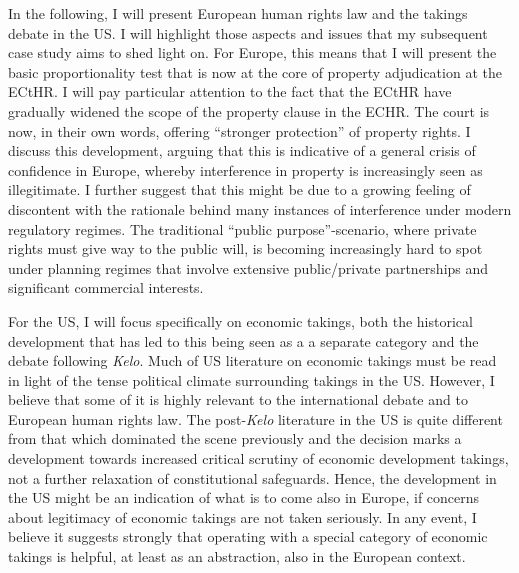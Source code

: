 In the following, I will present European human rights law and the takings debate in the US. I will highlight those aspects and issues that my subsequent case study aims to shed light on. For Europe, this means that I will present the basic proportionality test that is now at the core of property adjudication at the ECtHR. I will pay particular attention to the fact that the ECtHR have gradually widened the scope of the property clause in the ECHR. The court is now, in their own words, offering ``stronger protection'' of property rights. I discuss this development, arguing that this is indicative of a general crisis of confidence in Europe, whereby interference in property is increasingly seen as illegitimate. I further suggest that this might be due to a growing feeling of discontent with the rationale behind many instances of interference under modern regulatory regimes. The traditional ``public purpose''-scenario, where private rights must give way to the public will, is becoming increasingly hard to spot under planning regimes that involve extensive public/private partnerships and significant commercial interests.

For the US, I will focus specifically on economic takings, both the historical development that has led to this being seen as a a separate category and the debate following {\it Kelo}. Much of US literature on economic takings must be read in light of the tense political climate surrounding takings in the US. However, I believe that some of it is highly relevant to the international debate and to European human rights law. The post-{\it Kelo} literature in the US is quite different from that which dominated the scene previously and the decision marks a development towards increased critical scrutiny of economic development takings, not a further relaxation of constitutional safeguards. Hence, the development in the US might be an indication of what is to come also in Europe, if concerns about legitimacy of economic takings are not taken seriously. In any event, I believe it suggests strongly that operating with a special category of economic takings is helpful, at least as an abstraction, also in the European context.

